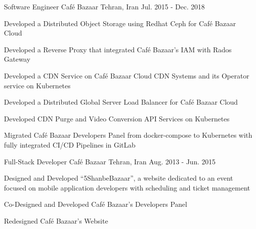 

\begin{cventries}
  \cventry
    {Software Engineer} %
    {Café Bazaar} %
    {Tehran, Iran} %
    {Jul. 2015 - Dec. 2018} %
    {
      \begin{cvitems} %
        \item {Developed a Distributed Object Storage using Redhat Ceph for Café Bazaar Cloud}
        \item {Developed a Reverse Proxy that integrated Café Bazaar's IAM with Rados Gateway}
        \item {Developed a CDN Service on Café Bazaar Cloud CDN Systems and its Operator service on Kubernetes}
        \item {Developed a Distributed Global Server Load Balancer for Café Bazaar Cloud}
        \item {Developed CDN Purge and Video Conversion API Services on Kubernetes}
        \item {Migrated Café Bazaar Developers Panel from docker-compose to Kubernetes with fully integrated CI/CD Pipelines in GitLab}
      \end{cvitems}
    }

  \cventry
    {Full-Stack Developer} %
    {Café Bazaar} %
    {Tehran, Iran} %
    {Aug. 2013 - Jun. 2015} %
    {
      \begin{cvitems} %
        \item {Designed and Developed “5ShanbeBazaar”, a website dedicated to an event focused on mobile application developers with scheduling and ticket management}
        \item {Co-Designed and Developed Café Bazaar’s Developers Panel}
        \item {Redesigned Café Bazaar’s Website}
      \end{cvitems}
    }
\end{cventries}
